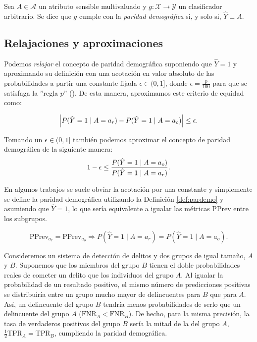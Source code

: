\documentclass[oneside,openright,titlepage,numbers=noenddot,openany,headinclude,footinclude=true,
cleardoublepage=empty,abstractoff,BCOR=5mm,paper=a4,fontsize=12pt,main=spanish]{scrreprt}
\begin{document}
\begin{definition} \label{def:pardemo}
Sea $A \in \mathcal{A}$ un atributo sensible multivaluado y $g\colon \mathcal{X} \to \mathcal{Y}$ un clasificador arbitrario. Se dice que $g$ cumple con la \textit{paridad demográfica} si, y solo si, $\hat{Y} \perp A.$
\end{definition}

\subsection*{Relajaciones y aproximaciones}

Podemos \textit{relajar} el concepto de paridad demográfica suponiendo que $\hat{Y}=1$ y aproximando su definición con una acotación en valor absoluto de las probabilidades a partir una constante fijada $\epsilon \in (0,1]$, donde $\epsilon=\frac{p}{100}$ para que se satisfaga la ''regla $p$'' (\cite{constraints2017}). De esta manera, aproximamos este criterio de equidad como: 

\begin{equation*}
\left\lvert P(\hat{Y}=1 \mid A=a_r)-P(\hat{Y}=1 \mid A=a_o)\right\rvert \leq \epsilon.
\end{equation*}

Tomando un $\epsilon \in (0,1]$ también podemos aproximar el concepto de paridad demográfica de la siguiente manera:
\begin{equation}\label{eq:p}
   1-\epsilon \leq \frac{\displaystyle P(\hat{Y}=1 \mid A=a_o)}{\displaystyle P(\hat{Y}=1 \mid A=a_r)}. 
\end{equation}

En algunos trabajos se suele obviar la acotación por una constante y simplemente se define la paridad demográfica utilizando la Definición \ref{def:pardemo} y asumiendo que $\hat{Y}=1$, lo que sería equivalente a igualar las métricas PPrev entre los subgrupos.

\begin{equation*}
\text{PPrev}_{a_r}=\text{PPrev}_{a_o} \Rightarrow P(\hat{Y}=1 \mid A=a_r)=P(\hat{Y}=1 \mid A=a_o).
\end{equation*}

\begin{example}
Consideremos un sistema de detección de delitos y dos grupos de igual tamaño, $A$ y $B$. Suponemos que los miembros del grupo $B$ tienen el doble probabilidades reales de cometer un delito que los individuos del grupo $A$. Al igualar la probabilidad de un resultado positivo, el mismo número de predicciones positivas se distribuiría entre un grupo mucho mayor de delincuentes para $B$ que para $A$. Así, un delincuente del grupo $B$ tendría menos probabilidades de serlo que un delincuente del grupo $A$ ($\text{FNR}_A < \text{FNR}_B$). De hecho, para la misma precisión, la tasa de verdaderos positivos del grupo $B$ sería la mitad de la del grupo $A$, $\frac{1}{2} \text{TPR}_A = \text{TPR}_B$, cumpliendo la paridad demográfica.
\end{example}
\end{document}
